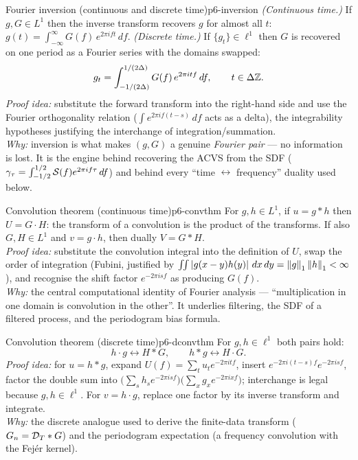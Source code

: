 \begin{theorem}{Fourier inversion (continuous and discrete time)}{p6-inversion}
\emph{(Continuous time.)} If $g,G\in L^1$ then the inverse transform recovers
$g$ for almost all $t$:
$g(t)=\int_{-\infty}^{\infty} G(f)\,e^{2\pi i f t}\,df$.
\emph{(Discrete time.)} If $\{g_t\}\in\ell^1$ then $G$ is recovered on one
period as a Fourier series with the domains swapped:
\[
g_t=\int_{-1/(2\Delta)}^{1/(2\Delta)} G(f)\,e^{2\pi i t f}\,df,\qquad
t\in\Delta\mathbb{Z} .
\]
\textit{Proof idea:} substitute the forward transform into the right-hand side
and use the Fourier orthogonality relation
($\int e^{2\pi i f(t-s)}\,df$ acts as a delta), the integrability hypotheses
justifying the interchange of integration/summation.\\
\textit{Why:} inversion is what makes $(g,G)$ a genuine \emph{Fourier pair} ---
no information is lost. It is the engine behind recovering the ACVS from the SDF
($\gamma_\tau=\int_{-1/2}^{1/2}\mathcal{S}(f)e^{2\pi i f\tau}\,df$) and behind every
``time $\leftrightarrow$ frequency'' duality used below.
\end{theorem}

\begin{theorem}{Convolution theorem (continuous time)}{p6-convthm}
For $g,h\in L^1$, if $u=g*h$ then $U=G\cdot H$: the transform of a convolution
is the product of the transforms. If also $G,H\in L^1$ and $v=g\cdot h$, then
dually $V=G*H$.\\[2pt]
\textit{Proof idea:} substitute the convolution integral into the definition of
$U$, swap the order of integration (Fubini, justified by
$\iint\left\lvert g(x-y)h(y) \right\rvert\,dx\,dy=\left\lVert g \right\rVert_1\left\lVert h \right\rVert_1<\infty$), and recognise the
shift factor $e^{-2\pi i s f}$ as producing $G(f)$.\\
\textit{Why:} the central computational identity of Fourier analysis ---
``multiplication in one domain is convolution in the other''. It underlies
filtering, the SDF of a filtered process, and the periodogram bias formula.
\end{theorem}

\begin{theorem}{Convolution theorem (discrete time)}{p6-dconvthm}
For $g,h\in\ell^1$ both pairs hold:
\[
h\cdot g \longleftrightarrow H*G,\qquad
h*g \longleftrightarrow H\cdot G .
\]
\textit{Proof idea:} for $u=h*g$, expand $U(f)=\sum_t u_t e^{-2\pi i t f}$,
insert $e^{-2\pi i (t-s)f}e^{-2\pi i s f}$, factor the double sum into
$\big(\sum_s h_s e^{-2\pi i s f}\big)\big(\sum_x g_x e^{-2\pi i x f}\big)$;
interchange is legal because $g,h\in\ell^1$. For $v=h\cdot g$, replace one
factor by its inverse transform and integrate.\\
\textit{Why:} the discrete analogue used to derive the finite-data transform
($G_n=\mathcal{D}_T*G$) and the periodogram expectation (a frequency convolution with
the Fej\'er kernel).
\end{theorem}

